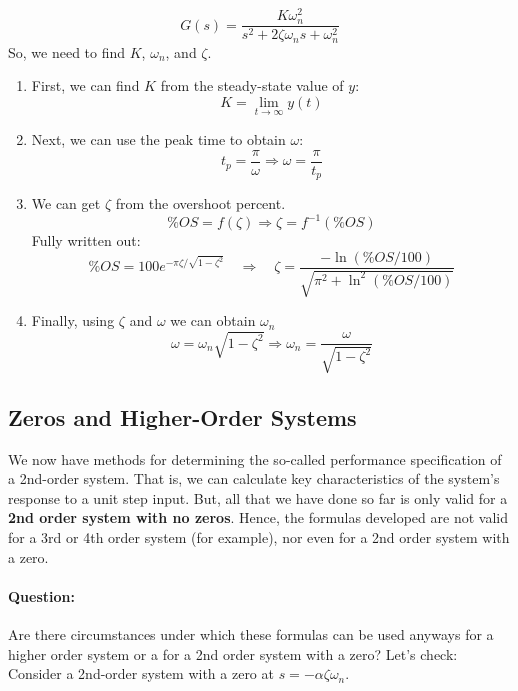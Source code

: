 \documentclass{book}
\newcommand{\zw}{\zeta\omega_n}
\begin{document}
\[ G(s)=\frac{K\omega_n^2}{s^2+2\zw s + \omega_n^2} \]
So, we need to find $ K $, $ \omega_n $, and $ \zeta $.
\begin{enumerate}
	\item First, we can find $ K $ from the steady-state value of $ y $:
	\[ K=\lim_{t\to\infty} y(t) \]
	\item Next, we can use the peak time to obtain $ \omega $:
	\[ t_p = \frac{\pi}{\omega} \Rightarrow \omega = \frac{\pi}{t_p} \]
	\item We can get $ \zeta $ from the overshoot percent.
	\[ \%OS = f(\zeta) \Rightarrow \zeta = f^{-1}(\%OS) \]
	Fully written out: 
	\[ \%OS = 100e^{-\pi\zeta / \sqrt{1-\zeta^2}} \quad\Rightarrow\quad \zeta = \dfrac{-\ln\left(\%OS / 100\right)}{\sqrt{\pi^2+\ln^2\left(\%OS / 100\right)}} \]
	\item Finally, using $ \zeta $ and $ \omega $ we can obtain $ \omega_n $
	\[ \omega = \omega_n \sqrt{1-\zeta^2} \Rightarrow \omega_n = \dfrac{\omega}{\sqrt{1-\zeta^2}} \]
\end{enumerate}

\subsection*{Zeros and Higher-Order Systems}
We now have methods for determining the so-called performance specification of a 2nd-order system. That is, we can calculate key characteristics of the system's response to a unit step input. But, all that we have done so far is only valid for a \textbf{2nd order system with no zeros}. Hence, the formulas developed are not valid for a 3rd or 4th order system (for example), nor even for a 2nd order system with a zero.

\paragraph{Question:} Are there circumstances under which these formulas can be used anyways for a higher order system or a for a 2nd order system with a zero? Let's check: Consider a 2nd-order system with a zero at $ s=-\alpha \zeta \omega_n $.
\end{document}
